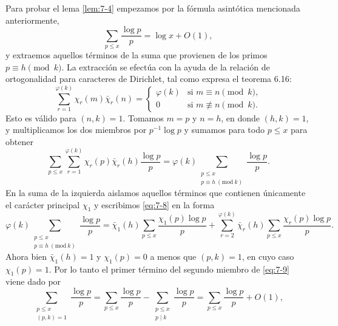 \documentclass[12pt,a4paper]{book}
\begin{document}
    Para probar el lema \ref{lem:7-4} empezamos por la fórmula asintótica mencionada
    anteriormente,
    \begin{equation}\label{eq:7-2b}
        \sum_{p\leq x}\frac{\log p}{p}=\log x+O(1),
    \end{equation}
    y extraemos aquellos términos de la suma que provienen de los primos
    $p\equiv h\pmod{k}$. La extracción se efectúa con la ayuda de la relación de
    ortogonalidad para caracteres de Dirichlet, tal como expresa el teorema 6.16:
    \begin{equation*}
        \sum_{r=1}^{\varphi(k)}\chi_{r}(m)\bar{\chi}_{r}(n)=
        \begin{cases}
            \varphi(k)&\text{si }m\equiv n\pmod{k},\\
            0&\text{si }m\not\equiv n\pmod{k}.
        \end{cases}
    \end{equation*}
    Esto es válido para $(n,k)=1$. Tomamos $m=p$ y $n=h$, en donde $(h,k)=1$, y
    multiplicamos los dos miembros por $p^{-1}\log p$ y sumamos para todo $p\leq x$ para
    obtener
    \begin{equation}\label{eq:7-8}
        \sum_{p\leq x}\sum_{r=1}^{\varphi(k)}\chi_{r}(p)\bar{\chi}_{r}(h)\frac{\log p}{p}
        =\varphi(k)\sum_{\substack{p\leq x\\p\equiv h\ (\mathrm{mod}\ k)}}\frac{\log p}{p}.
    \end{equation}
    En la suma de la izquierda aislamos aquellos términos que contienen únicamente el
    carácter principal $\chi_{1}$ y escribimos \eqref{eq:7-8} en la forma
    \begin{equation}\label{eq:7-9}
        \varphi(k)\sum_{\substack{p\leq x\\p\equiv h\ (\mathrm{mod}\ k)}}\frac{\log p}{p}
        =\bar{\chi}_{1}(h)\sum_{p\leq x}\frac{\chi_{1}(p)\log p}{p}
        +\sum_{r=2}^{\varphi(k)}\bar{\chi}_{r}(h)\sum_{p\leq x}\frac{\chi_{r}(p)\log p}{p}.
    \end{equation}
    Ahora bien $\bar{\chi}_{1}(h)=1$ y $\chi_{1}(p)=0$ a menos que $(p,k)=1$, en cuyo caso
    $\chi_{1}(p)=1$. Por lo tanto el primer término del segundo miembro de \eqref{eq:7-9}
    viene dado por
    \begin{equation}\label{eq:7-10}
        \sum_{\substack{p\leq x\\(p,k)=1}}\frac{\log p}{p}
        =\sum_{p\leq x}\frac{\log p}{p}-\sum_{\substack{p\leq x\\p\mid k}}\frac{\log p}{p}
        =\sum_{p\leq x}\frac{\log p}{p}+O(1),
    \end{equation}
\end{document}
